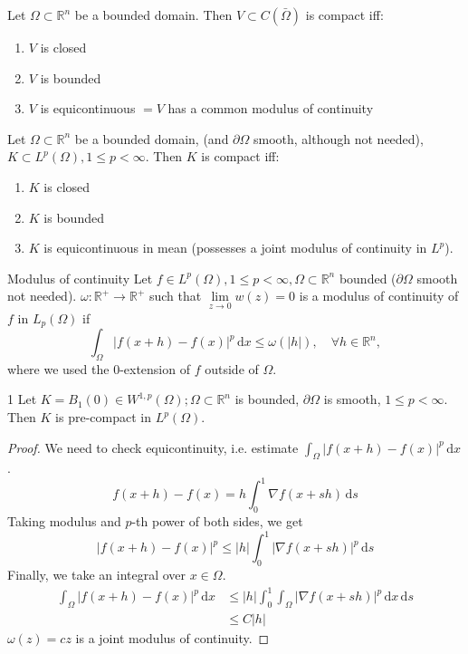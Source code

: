 \documentclass{report}
\begin{document}
{
    Let \(\Omega \subset \mathbb{R}^{n}\) be a bounded domain. Then \(V \subset C(\bar{\Omega})\) is compact iff:
    \begin{enumerate}
        \item \(V\)  is closed
        \item \(V\) is bounded
        \item \(V\) is equicontinuous \(= V\) has a common modulus of continuity
    \end{enumerate} 
}

{
    Let \(\Omega \subset \mathbb{R}^{n}\) be a bounded domain, (and \(\partial \Omega\) smooth, although not needed), \(K \subset L^{p}(\Omega), 1 \leq p < \infty\). Then \(K\) is compact iff:
    \begin{enumerate}
        \item \(K\) is closed
        \item \(K\) is bounded
        \item \(K\) is equicontinuous in mean (possesses a joint modulus of continuity in \(L^p\)).
    \end{enumerate} 
}

\begin{definition}{Modulus of continuity}{}
    Let \(f \in L^p(\Omega), 1 \leq p < \infty, \Omega \subset \mathbb{R}^{n}\) bounded (\(\partial \Omega\) smooth not needed). \(\omega \colon \mathbb{R}^{+} \to \mathbb{R}^{+}\) such that \(\lim\limits_{z \to 0} w(z) = 0\) is a modulus of continuity of \(f\) in \(L_{p}(\Omega)\) if 
    \[
        \int_{\Omega} \vert f(x+h) - f(x) \vert ^p \,\mathrm{d}x \leq \omega(\vert h \vert ), \quad \forall h \in \mathbb{R}^n,
    \]
    where we used the \(0\)-extension of \(f\) outside of \(\Omega\). 
\end{definition}

\begin{corollary}{}{1}
    Let \(K = B_{1}(0) \in W^{1, p}(\Omega); \Omega \subset \mathbb{R}^{n}\) is bounded, \(\partial \Omega\) is smooth, \(1 \leq p < \infty\). Then \(K\) is pre-compact in \(L^{p}(\Omega)\).
\end{corollary}

\begin{proof}
    We need to check equicontinuity, i.e. estimate \(\int_{\Omega} \vert f(x+h) - f(x) \vert ^p \,\mathrm{d}x \).
    \[
        f(x+h) - f(x) = h \int_{0}^{1} \nabla f(x + sh) \,\mathrm{d}s
    \]
    Taking modulus and \(p\)-th power of both sides, we get
    \[
        \vert f(x+h) - f(x) \vert ^p \leq \vert h \vert \int_{0}^{1} \vert \nabla f(x + sh) \vert ^p \,\mathrm{d}s 
    \]
    Finally, we take an integral over \(x \in \Omega\).
    \begin{align*}
        \int_{\Omega} \vert f(x+h) - f(x) \vert ^p \,\mathrm{d}x &\leq \vert h \vert \int_{0}^{1} \int_{\Omega} \vert \nabla f(x + sh) \vert ^p \,\mathrm{d}x \,\mathrm{d}s \\
        &\leq C \vert h \vert
    \end{align*}
    \(\omega(z) = cz\) is a joint modulus of continuity.
\end{proof}
\end{document}
